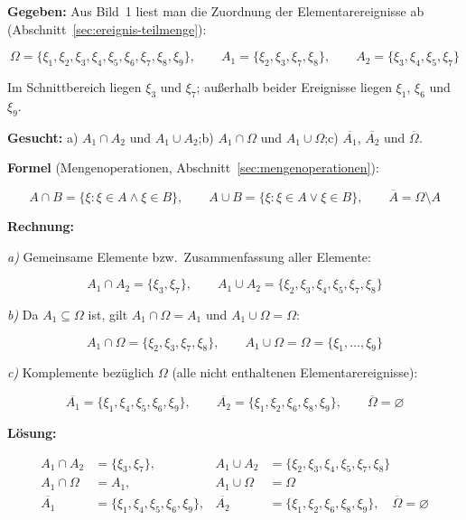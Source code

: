 \begin{beispiel}

\textbf{Gegeben:} Aus Bild~1 liest man die Zuordnung der Elementarereignisse ab
(Abschnitt~\ref{sec:ereignis-teilmenge}):

$$
\Omega = \{\xi_1,\xi_2,\xi_3,\xi_4,\xi_5,\xi_6,\xi_7,\xi_8,\xi_9\},\qquad
A_1 = \{\xi_2,\xi_3,\xi_7,\xi_8\},\qquad
A_2 = \{\xi_3,\xi_4,\xi_5,\xi_7\}
$$

Im Schnittbereich liegen $\xi_3$ und $\xi_7$; außerhalb beider Ereignisse liegen
$\xi_1$, $\xi_6$ und $\xi_9$.

\textbf{Gesucht:} a) $A_1\cap A_2$ und $A_1\cup A_2$;\quad b) $A_1\cap\Omega$ und
$A_1\cup\Omega$;\quad c) $\overline{A_1}$, $\overline{A_2}$ und $\overline{\Omega}$.

\textbf{Formel} (Mengenoperationen, Abschnitt~\ref{sec:mengenoperationen}):

$$
A\cap B = \{\xi : \xi\in A \wedge \xi\in B\},\qquad
A\cup B = \{\xi : \xi\in A \vee \xi\in B\},\qquad
\overline{A} = \Omega\setminus A
$$

\textbf{Rechnung:}

\emph{a)} Gemeinsame Elemente bzw.\ Zusammenfassung aller Elemente:

$$
A_1\cap A_2 = \{\xi_3,\xi_7\},\qquad
A_1\cup A_2 = \{\xi_2,\xi_3,\xi_4,\xi_5,\xi_7,\xi_8\}
$$

\emph{b)} Da $A_1\subseteq\Omega$ ist, gilt $A_1\cap\Omega = A_1$ und $A_1\cup\Omega=\Omega$:

$$
A_1\cap\Omega = \{\xi_2,\xi_3,\xi_7,\xi_8\},\qquad
A_1\cup\Omega = \Omega = \{\xi_1,\ldots,\xi_9\}
$$

\emph{c)} Komplemente bezüglich $\Omega$ (alle nicht enthaltenen Elementarereignisse):

$$
\overline{A_1} = \{\xi_1,\xi_4,\xi_5,\xi_6,\xi_9\},\qquad
\overline{A_2} = \{\xi_1,\xi_2,\xi_6,\xi_8,\xi_9\},\qquad
\overline{\Omega} = \varnothing
$$

\textbf{Lösung:}

$$
\boxed{
\begin{aligned}
A_1\cap A_2 &= \{\xi_3,\xi_7\}, & A_1\cup A_2 &= \{\xi_2,\xi_3,\xi_4,\xi_5,\xi_7,\xi_8\}\\
A_1\cap\Omega &= A_1, & A_1\cup\Omega &= \Omega\\
\overline{A_1} &= \{\xi_1,\xi_4,\xi_5,\xi_6,\xi_9\}, & \overline{A_2} &= \{\xi_1,\xi_2,\xi_6,\xi_8,\xi_9\},\quad \overline{\Omega} = \varnothing
\end{aligned}
}
$$

\end{beispiel}


